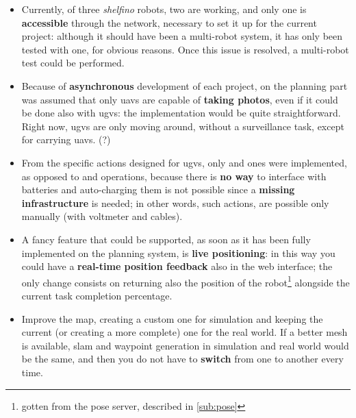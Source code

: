\begin{itemize}

\item Currently, of three \textit{shelfino} robots, two are working, and only one is \textbf{accessible} through the network, necessary to set it up for the current project: although it should have been a multi-robot system, it has only been tested with one, for obvious reasons. Once this issue is resolved, a multi-robot test could be performed.

\item Because of \textbf{asynchronous} development of each project, on the planning part was assumed that only \acrshort{uavs} are capable of \textbf{taking photos}, even if it could be done also with \acrshort{ugvs}: the implementation would be quite straightforward. Right now, \acrshort{ugvs} are only moving around, without a surveillance task, except for carrying \acrshort{uavs}. (?) 

\item From the specific actions designed for \acrshort{ugvs}, only  and  ones were implemented, as opposed to  and  operations, because there is \textbf{no way} to interface with batteries and auto-charging them is not possible since a \textbf{missing infrastructure} is needed; in other words, such actions, are possible only manually (with voltmeter and cables).

\item A fancy feature that could be supported, as soon as it has been fully implemented on the planning system, is \textbf{live positioning}: in this way you could have a \textbf{real-time position feedback} also in the web interface; the only change consists on returning also the position of the robot\footnote{gotten from the pose server, described in \autoref{sub:pose}} alongside the current task completion percentage.


\item Improve the map, creating a custom one for simulation and keeping the current (or creating a more complete) one for the real world. If a better mesh is available, \acrshort{slam} and waypoint generation in simulation and real world would be the same, and then you do not have to \textbf{switch} from one to another every time.


\end{itemize}